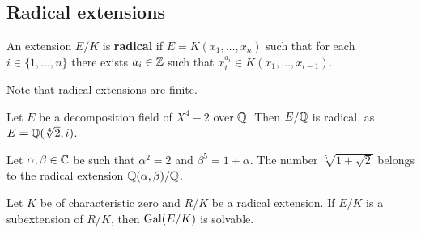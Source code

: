 \chapter{}

\section{Radical extensions}

\begin{definition}
    An extension $E/K$ is \textbf{radical} if $E=K(x_1,\dots,x_n)$ 
    such that for each $i\in\{1,\dots,n\}$ there exists $a_i\in\mathbb{Z}$ 
    such that $x_i^{a_i}\in K(x_1,\dots,x_{i-1})$. 
\end{definition}

Note that radical extensions are finite. 

\begin{example}
    Let $E$ be a decomposition field of $X^4-2$ over $\mathbb{Q}$. Then $E/\mathbb{Q}$ is radical, 
    as $E=\mathbb{Q}(\sqrt[4]{2},i)$. 
\end{example}

\begin{example}
    Let $\alpha,\beta\in\mathbb{C}$ be such that $\alpha^2=2$ and 
    $\beta^5=1+\alpha$. 
    The number $\sqrt[5]{1+\sqrt{2}}$ belongs to the radical extension $\mathbb{Q}(\alpha,\beta)/\mathbb{Q}$. 
\end{example}

\begin{theorem}
\label{thm:by_radicals}
    Let $K$ be of characteristic zero and 
    $R/K$ be a radical extension. If $E/K$ is a subextension of $R/K$, 
    then $\operatorname{Gal}(E/K)$ is solvable. 
\end{theorem}

